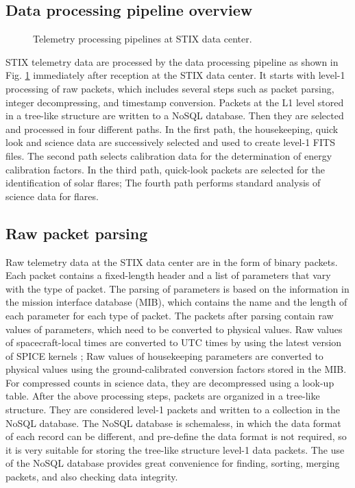 \documentclass[referee]{preaa} %
\begin{document}
\subsection{Data processing pipeline overview}

\begin{figure}
    \centering
    \caption{Telemetry processing pipelines at STIX data center.}
    \label{fig:main_pipelines}
\end{figure}
STIX telemetry data are processed by the data processing pipeline  
as shown in Fig. \ref{fig:main_pipelines} immediately after reception at the STIX data center.  It starts with level-1 processing of raw packets, which includes several steps such as  packet parsing,  integer decompressing, and timestamp conversion. 
Packets at the L1 level stored in a tree-like structure are written to a NoSQL database. Then they are selected and processed in four different paths. 
In the first path, the housekeeping, quick look and science data are successively selected and used to create level-1 FITS files. 
The second path selects calibration data for the determination
 of energy calibration factors.   In the third path, quick-look packets are selected  for the identification of solar  flares; 
The fourth path performs standard analysis of science data for flares.

\subsection{Raw packet parsing}
Raw telemetry data at the STIX data center are in the form of binary packets. 
Each packet contains a fixed-length header and a list of parameters that vary with the type of packet.  The parsing of parameters is based on the information in 
the mission interface database (MIB), which contains the name and the 
length of each parameter for each type of packet. 
The packets after parsing contain raw values of parameters, 
which need to be converted to physical values. 
Raw values of spacecraft-local times are converted to UTC times by using 
the latest version of SPICE kernels \citep{spice1996,spice2018};
Raw values of  housekeeping parameters are converted to physical values using 
the  ground-calibrated conversion factors stored in the MIB. 
For compressed counts in science data, they are decompressed using a look-up table. 
After the above processing steps, packets are organized in a tree-like structure. 
They are considered level-1 packets and written to a collection in the NoSQL database. 
The NoSQL database is schemaless, in which the data format of each record can be different, and pre-define the data format is not required, so it is very suitable for storing the tree-like structure level-1 data packets.  
The use of the NoSQL database provides great convenience for finding, sorting, merging packets, and also checking data integrity. 
\end{document}
